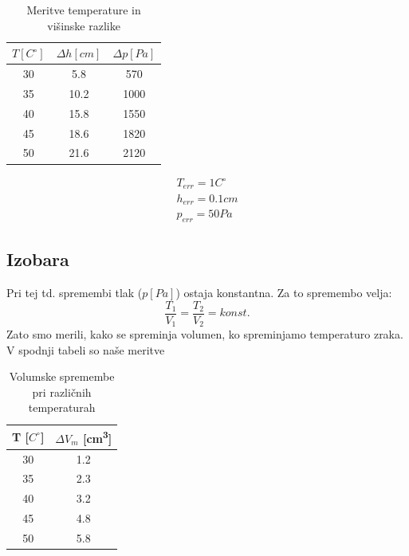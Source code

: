 \documentclass[11pt]{article}
\begin{document}
        \begin{table}[H]
            \centering
            \begin{tabular}{|c|c|c|}
                \hline
                $T[C^\circ]$ & $\Delta h[cm]$ & $\Delta p[Pa]$\\
                \hline
                30 & 5.8  & 570 \\
                35 & 10.2 & 1000 \\
                40 & 15.8 & 1550 \\
                45 & 18.6 & 1820 \\
                50 & 21.6 & 2120 \\
                \hline
            \end{tabular}
            \caption{Meritve temperature in višinske razlike}
            \label{tab:temp-dh}
        \end{table}
    \begin{align*}
        T_{err} = 1 C^{\circ} \\
        h_{err} = 0.1 cm \\
        p_{err} = 50 Pa
    \end{align*}


    \subsection{Izobara}
        Pri tej td. spremembi tlak ($p[Pa]$) ostaja konstantna.
        Za to spremembo velja:
        \[
            \frac{T_1}{V_1} = \frac{T_2}{V_2} = konst.
        \]
        Zato smo merili, kako se spreminja volumen, ko spreminjamo temperaturo zraka.
        V spodnji tabeli so naše meritve

    \begin{table}[H]
        \centering
        \begin{tabular}{|c|c|}
            \hline
            \textbf{T [$C^\circ$]} & \textbf{$\Delta V_m$ [cm\textsuperscript{3}]} \\
            \hline
            30                     & 1.2                                           \\
            35                     & 2.3                                           \\
            40                     & 3.2                                           \\
            45                     & 4.8                                           \\
            50                     & 5.8                                           \\
            \hline
        \end{tabular}
        \caption{Volumske spremembe pri različnih temperaturah}
        \label{tab:temp-dV}
        \end{table}
\end{document}
